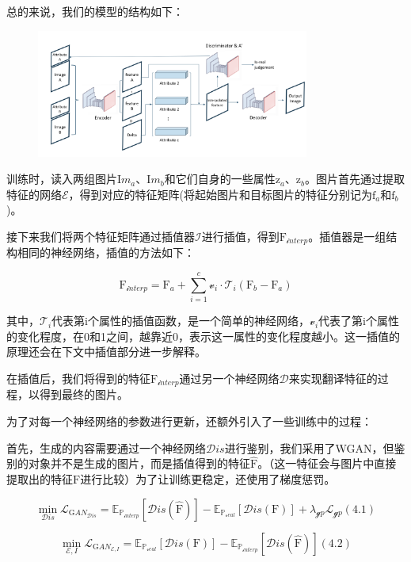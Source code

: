 \documentclass[UTF8,a4paper，12pt]{article}
\def\MC {\mathcal}
\theoremstyle{theorem}
\theoremstyle{definition}
\begin{document}
总的来说，我们的模型的结构如下：

\begin{figure}[htbp]
	\centering
	\includegraphics[width=0.8\textwidth]{assets/mdl}
	\caption{}
\end{figure}

训练时，读入两组图片$\mathrm Im_a$、$\mathrm Im_b$和它们自身的一些属性$\mathrm z_a$、$\mathrm z_b$。图片首先通过提取特征的网络$\MC E$，得到对应的特征矩阵(将起始图片和目标图片的特征分别记为$\mathrm f_a$和$\mathrm f_b$)。

接下来我们将两个特征矩阵通过插值器$\MC I$进行插值，得到$\mathrm F_{\MC interp}$。插值器是一组结构相同的神经网络，插值的方法如下：

$$\mathrm F_{\MC interp} = \mathrm F_a + \sum_{i=1}^{c}{\MC v_i \cdot \MC T_i(\mathrm F_b - \mathrm F_a)}$$

其中，$\MC T_i$代表第$\mathrm i$个属性的插值函数，是一个简单的神经网络，$\MC v_i$代表了第$\mathrm i$个属性的变化程度，在0和1之间，越靠近0，表示这一属性的变化程度越小。这一插值的原理还会在下文中插值部分进一步解释。

在插值后，我们将得到的特征$\mathrm F_{\MC interp}$通过另一个神经网络$\MC D$来实现翻译特征的过程，以得到最终的图片。

为了对每一个神经网络的参数进行更新，还额外引入了一些训练中的过程：

首先，生成的内容需要通过一个神经网络$\MC Dis$进行鉴别，我们采用了WGAN，但鉴别的对象并不是生成的图片，而是插值得到的特征$\hat{\mathrm F}$。（这一特征会与图片中直接提取出的特征$\mathrm F$进行比较）为了让训练更稳定，还使用了梯度惩罚。

$$\min_{\MC Dis} \MC L_{\mathrm GAN_{\MC Dis}} = \mathbb E_{\mathbb P_{\MC interp}}[\MC Dis(\hat{\mathrm F})] - \mathbb E_{\mathbb P_{\MC real}}[\MC Dis(\mathrm F)] + \lambda_{\MC gp}\MC L_{\MC gp}    (4.1)$$

$$\min_{\MC E,I} \MC L_{\mathrm GAN_{\MC E,I}} = \mathbb E_{\mathbb P_{\MC real}}[\MC Dis(\mathrm F)] - \mathbb E_{\mathbb P_{\MC interp}}[\MC Dis(\hat{\mathrm F})]    (4.2)$$
\end{document}
